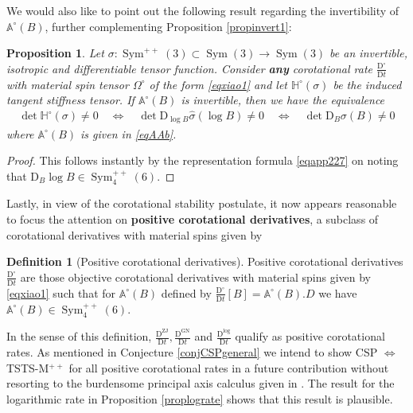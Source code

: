\documentclass[10pt]{article}
\newcounter{theoremCounter}
\numberwithin{theoremCounter}{section}
\theoremstyle{plain}
\newtheorem{prop}[theoremCounter]{Proposition}
\theoremstyle{definition}
\newtheorem{definition}[theoremCounter]{Definition}
\newcommand{\red}[1]{{\color{red}#1}}
\newcommand{\DD}{\mathrm{D}}
\DeclareMathOperator{\Sym}{Sym}
\DeclareMathOperator{\ZJ}{ZJ}
\DeclareMathOperator{\GN}{GN}
\def\H{\mathbb{H}}
\numberwithin{equation}{section}
\begin{document}
We would also like to point out the following result regarding the invertibility of $\mathbb{A}^{\circ}(B)$, further complementing Proposition \ref{propinvert1}:
%
\begin{prop} \label{prop3.23a}
Let $\sigma\colon \Sym^{++}(3) \subset \Sym(3) \to \Sym(3)$ be an invertible, isotropic and differentiable tensor function. Consider \textbf{any} corotational rate $\frac{\DD^{\circ}}{\DD t}$ with material spin tensor $\Omega^{\circ}$ of the form \eqref{eqxiao1} and let $\H^{\circ}(\sigma)$ be the induced tangent stiffness tensor. If $\mathbb{A}^{\circ}(B)$ is invertible, then we have the equivalence
	\begin{align}
	\det \H^{\circ}(\sigma) \neq 0 \quad \iff \quad \det \DD_{\log B} \widehat \sigma(\log B) \neq 0 \quad \iff \quad \det \DD_B \sigma(B) \neq 0
	\end{align}
where $\mathbb{A}^{\circ}(B)$ is given in \eqref{eqAAb}.
\end{prop}
%
\begin{proof}
This follows instantly by the representation formula \eqref{eqapp227} on noting that $\DD_B \log B \in \Sym^{++}_4(6)$.
\end{proof}
%
\noindent Lastly, in view of the corotational stability postulate, it now appears reasonable to focus the attention on \textbf{positive corotational derivatives}, a subclass of corotational derivatives with material spins given by
%
\begin{definition}[Positive corotational derivatives] \label{appendixpcd}
Positive corotational derivatives $\frac{\DD^{\circ}}{\DD t}$ are those objective corotational derivatives with material spins given by \eqref{eqxiao1} such that for $\mathbb{A}^{\circ}(B)$ defined by $\frac{\DD^{\circ}}{\DD t}[B] = \mathbb{A}^{\circ}(B).D$ we have $\mathbb{A}^{\circ}(B) \in \Sym^{++}_4(6)$.
\end{definition}
%
\noindent In the sense of this definition, $\frac{\DD^{\ZJ}}{\DD t}, \frac{\DD^{\GN}}{\DD t}$ and $\frac{\DD^{\log}}{\DD t}$ qualify as positive corotational rates. As mentioned in Conjecture \ref{conjCSPgeneral} we intend to show CSP $\iff$ TSTS-M$^{++}$ for all positive corotational rates in a future contribution without resorting to the burdensome principal axis calculus given in \cite{tobedone}. The result for the logarithmic rate in Proposition \ref{proplograte} shows that this result is plausible.



%
%
%
%
%
%
\clearpage
%
\end{document}
